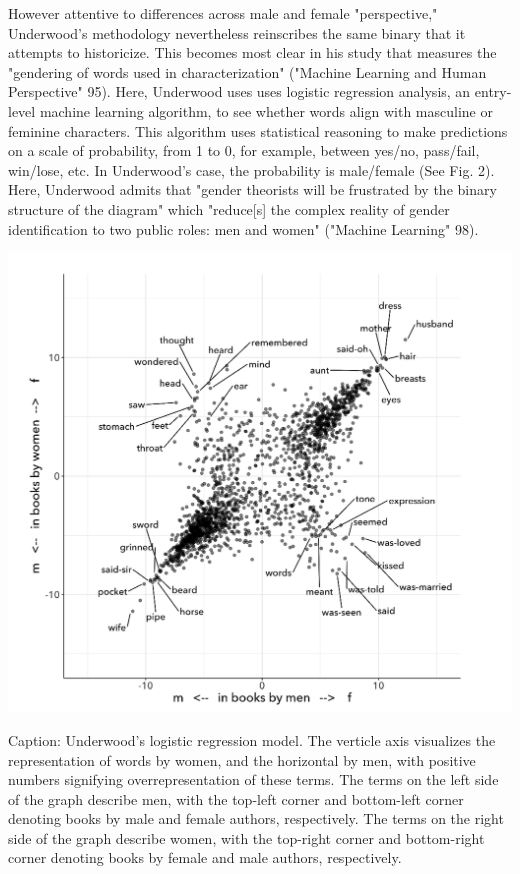 \documentclass[11pt]{article}
\begin{document}
However attentive to differences across male and female "perspective,"
Underwood's methodology nevertheless reinscribes the same binary that
it attempts to historicize. This becomes most clear in his study that
measures the "gendering of words used in characterization" ("Machine
Learning and Human Perspective" 95). Here, Underwood uses uses
logistic regression analysis, an entry-level machine learning
algorithm, to see whether words align with masculine or feminine
characters. This algorithm uses statistical reasoning to make
predictions on a scale of probability, from 1 to 0, for example,
between yes/no, pass/fail, win/lose, etc. In Underwood's case, the
probability is male/female (See Fig. 2). Here, Underwood admits that
"gender theorists will be frustrated by the binary structure of the
diagram" which "reduce[s] the complex reality of gender identification
to two public roles: men and women" ("Machine Learning" 98).

\begin{center}
\includegraphics[width=.9\linewidth]{./img/Underwood.png}
\end{center} Caption: Underwood's logistic regression
model. The verticle axis visualizes the representation of words by
women, and the horizontal by men, with positive numbers signifying
overrepresentation of these terms. The terms on the left side of the
graph describe men, with the top-left corner and bottom-left corner
denoting books by male and female authors, respectively. The terms on
the right side of the graph describe women, with the top-right corner
and bottom-right corner denoting books by female and male authors,
respectively.
\end{document}
